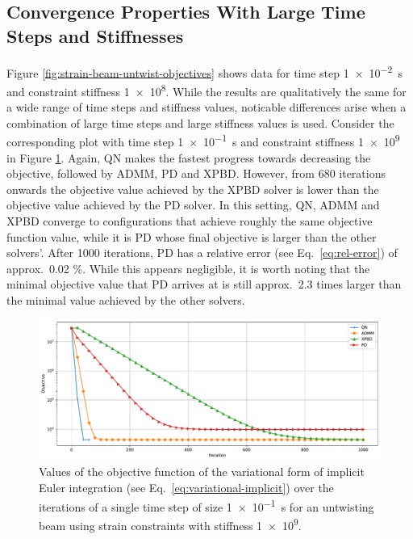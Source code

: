 \subsection{Convergence Properties With Large Time Steps and Stiffnesses}\label{ss:untwisting-beam-strain-convergence-large-ts}
Figure \ref{fig:strain-beam-untwist-objectives} shows data for time step \SI{1e-2}{\second} and constraint stiffness \num{1e8}. While the results are qualitatively 
the same for a wide range of time steps and stiffness values, noticable differences arise when a combination of large time steps and large stiffness values is used.
Consider the corresponding plot with time step \SI{1e-1}{\second} and constraint stiffness \num{1e9} in Figure \ref{fig:strain-beam-untwist-objectives-large-ts}. Again,
QN makes the fastest progress towards decreasing the objective, followed by ADMM, PD and XPBD. However, from 680 iterations onwards the objective value achieved by the XPBD 
solver is lower than the objective value achieved by the PD solver. In this setting, QN, ADMM and XPBD converge to configurations that achieve roughly the same objective 
function value, while it is PD whose final objective is larger than the other solvers'. After 1000 iterations, PD has a relative error (see Eq.\ \ref{eq:rel-error}) 
of approx.\ 0.02 \%. While this appears negligible, it is worth noting that the minimal objective value that PD arrives at is still approx.\ 2.3 
times larger than the minimal value achieved by the other solvers.


\begin{figure}[h]
    \includegraphics[width=\textwidth]{figures/strain_beam_untwist_objectives_large_ts.pdf}
    \caption{Values of the objective function of the variational form of implicit Euler integration (see Eq.\ \ref{eq:variational-implicit}) over the iterations of a single time 
        step of size \SI{1e-1}{\second} for an untwisting beam using strain constraints with stiffness \num{1e9}.}
    \label{fig:strain-beam-untwist-objectives-large-ts}
\end{figure}

